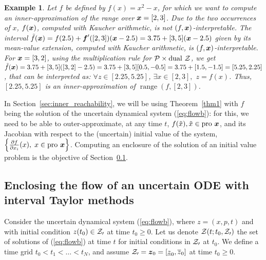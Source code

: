 \documentclass{sig-alternate-05-2015} %
\newtheorem{example}{Example}
\DeclareMathOperator{\range}{range}
\newcommand{\dual}{\mbox{dual }}
\newcommand{\pro}{\mbox{pro }}
\begin{document}
\begin{example}
Let $f$ be defined by $f(x)=x^2-x$, for which we want to compute an inner-approximation of the range over $\x=[2,3]$. Due to the
two occurrences of $x$, $f(\x)$, computed with Kaucher arithmetic, 
is not  $(f,\x)$-interpretable. The interval $\tilde{f}(\x) = f(2.5) + \f'([2,3]) (\x - 2.5)=3.75 + [3,5](\x - 2.5)$
given by its mean-value extension, computed with Kaucher arithmetic, is $(f,\x)$-interpretable. 
For  $\x=[3,2]$, using the multiplication rule for ${\cal P} \times \dual {\cal Z}$, we get 
$\tilde{f}(\x) = 3.75 + [3,5]([3,2] - 2.5)=  3.75 + [3,5] [0.5,-0.5] = 3.75 + [1.5,-1.5] = [5.25,2.25]$, that can be interpreted 
as: $\forall z \in [2.25,5.25]$, $\exists x \in [2,3],$  $z=f(x)$. Thus, $[2.25,5.25]$ is an inner-approximation of $\range(f,[2,3])$.
\end{example}

In Section~\ref{sec:inner_reachability}, we will be using Theorem~\ref{thm1} with $f$ being the solution of the uncertain dynamical system 
(\ref{eq:flowb}): for this, we need to be able to outer-approximate, at any time $t$, $f(\tilde x), \tilde x \in \pro \x$, 
and its Jacobian with respect to the (uncertain) initial value of the system, $\left\{ \frac{\partial f}{\partial x_i} (x), \; x \in \pro \x \right\}$.
Computing an enclosure of the solution of an initial value problem is the objective of Section~\ref{sec:Taylor}.  

\subsection{Enclosing the flow of an uncertain ODE with interval Taylor methods}
\label{sec:Taylor}
Consider the uncertain dynamical system (\ref{eq:flowb}), where $z=(x,p,t)$ and with initial condition 
$z(t_0) \in {\cal Z_0}$ at time $t_0 \geq 0$. Let us denote ${\cal Z}(t;t_0, {\cal Z_0})$ the set of solutions of  (\ref{eq:flowb}) 
at time $t$ for initial conditions in ${\cal Z_0}$ at $t_0$. We define a time grid $t_0 < t_1 < \ldots < t_N$, and assume
${\cal Z_0} = \z_0=[\underline{z}_0,\overline{z}_0]$ at time $t_0 \geq 0$. 
\end{document}

